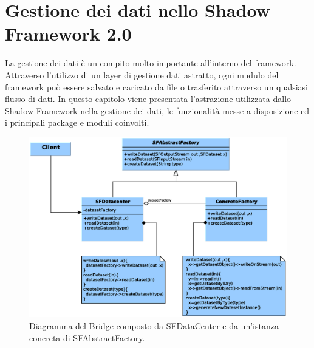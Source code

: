 
\chapter{Gestione dei dati nello Shadow Framework 2.0}
\label{ch:gestionedati}

La gestione dei dati \`e un compito molto importante all'interno del framework. Attraverso l'utilizzo di un layer di gestione dati astratto, ogni mudulo del framework pu\`o essere salvato e caricato da file o trasferito attraverso un qualsiasi flusso di dati.
In questo capitolo viene presentata l'astrazione utilizzata dallo Shadow Framework nella gestione dei dati, le funzionalit\`a messe a disposizione ed i principali package e moduli coinvolti.

\begin{figure}
\begin{center}
\includegraphics[width=\textwidth]{Immagini/DataCenterfactory}
\caption[Bridge composto da SFDataCenter e SFAbstractFactory]{Diagramma del Bridge composto da SFDataCenter e da un'istanza concreta di SFAbstractFactory.\label{f:datacenterfactory}} 
\end{center} 
\end{figure}

